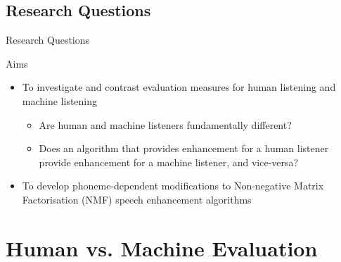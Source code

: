 \subsection{Research Questions}
\begin{frame}{Research Questions}
	\begin{block}{Aims}
		\begin{itemize}
			\item To investigate and contrast evaluation measures for human listening and machine listening
			\begin{itemize}
				\item Are human and machine listeners fundamentally different?
				\item Does an algorithm that provides enhancement for a human listener provide enhancement for a machine listener, and vice-versa?
			\end{itemize}
			\item To develop phoneme-dependent modifications to Non-negative Matrix Factorisation (NMF) speech enhancement algorithms
		\end{itemize}
	\end{block}
\end{frame}

\section{Human vs. Machine Evaluation}

